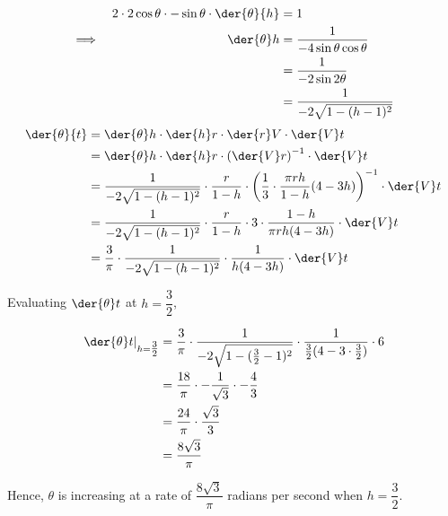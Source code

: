 \documentclass{jhwhw}
\begin{document}
            \begin{alignat*}{2}
                &&2\cdot 2 \cos\theta \cdot -\sin\theta \cdot \der{\theta}{h} &= 1\\
                \implies&&\der{\theta}h &= \dfrac{1}{-4\sin\theta\cos\theta}\\
                && &= \dfrac1{-2\sin 2\theta}\\
                && &= \dfrac1{-2 \sqrt{1 - (h-1)^2}}
            \end{alignat*}
            \begin{align*}
                \der{\theta}{t} &= \der{\theta}h \cdot \der{h}r \cdot \der{r}V \cdot \der{V}t\\
                &= \der{\theta}h \cdot \der{h}r \cdot \left(\der{V}r\right)^{-1} \cdot \der{V}t\\
                &= \dfrac1{-2 \sqrt{1 - (h-1)^2}} \cdot \dfrac{r}{1-h} \cdot \left(\dfrac13 \cdot \dfrac{\pi rh}{1-h} (4-3h) \right)^{-1} \cdot \der{V}t\\
                &= \dfrac1{-2 \sqrt{1 - (h-1)^2}} \cdot \dfrac{r}{1-h} \cdot 3 \cdot \dfrac{1-h}{\pi rh(4-3h)}  \cdot \der{V}t\\
                &= \dfrac3{\pi} \cdot \dfrac1{-2 \sqrt{1 - (h-1)^2}} \cdot \dfrac1{h(4-3h)}  \cdot \der{V}t
            \end{align*}

            Evaluating $\der{\theta}t$ at $h = \dfrac32$,

            \begin{align*}
                \left.\der{\theta}t\right|_{h = \tfrac32} &= \dfrac3{\pi} \cdot \dfrac1{-2 \sqrt{1 - (\tfrac32-1)^2}} \cdot \dfrac1{\tfrac32(4-3\cdot\tfrac32)}  \cdot 6\\
                &= \dfrac{18}{\pi} \cdot -\dfrac1{\sqrt{3}} \cdot -\dfrac43\\
                &= \dfrac{24}{\pi} \cdot \dfrac{\sqrt 3}{3}\\
                &= \dfrac{8\sqrt{3}}{\pi}
            \end{align*}

            Hence, $\theta$ is increasing at a rate of $\dfrac{8\sqrt3}{\pi}$ radians per second when $h = \dfrac32$.

\end{document}
